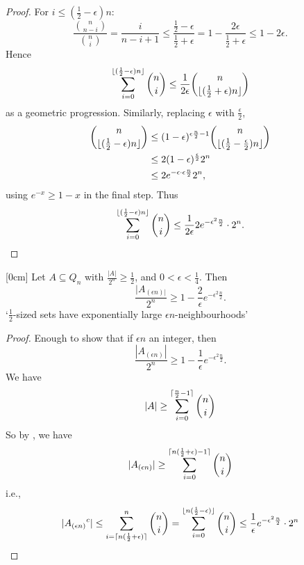 \documentclass{article}
\DeclarePairedDelimiter\ceil{\lceil}{\rceil}
\DeclarePairedDelimiter\floor{\lfloor}{\rfloor}
\let\subset\subseteq
\begin{document}
\begin{proof}
  For $i \leq (\frac{1}{2} - \epsilon) n:$
  \begin{equation*}
    \frac{\binom{n}{n-i}}{\binom{n}{i}} = \frac{i}{n-i+1} \leq \frac{\frac{1}{2} - \epsilon}{\frac{1}{2} + \epsilon} = 1 - \frac{2\epsilon}{\frac{1}{2} + \epsilon} \leq 1 - 2\epsilon.
  \end{equation*}
  Hence
  \begin{equation*}
    \sum_{i=0}^{\floor{(\frac{1}{2}-\epsilon) n}} \binom{n}{i} \leq \frac{1}{2\epsilon} \binom{n}{\floor{(\frac{1}{2} + \epsilon) n}}
  \end{equation*}
  as a geometric progression.
  Similarly, replacing $\epsilon$ with $\frac \epsilon 2$,
  \begin{align*}
    \binom{n}{\floor{(\frac{1}{2} - \epsilon)n}} &\leq (1-\epsilon)^{\epsilon \frac{n}{2} - 1} \binom{n}{\floor{(\frac{1}{2} - \frac{\epsilon}{2}) n}} \\
                                                 &\leq 2(1-\epsilon)^{\frac \epsilon 2} 2^n \\
                                                 &\leq 2 e^{-\epsilon \cdot \epsilon \frac n2} 2^n,
  \end{align*}
  using $e^{-x} \geq 1-x$ in the final step.
  Thus
  \begin{equation*}
    \sum_{i=0}^{\floor{(\frac{1}{2} - \epsilon) n}} \binom{n}{i}\leq \frac{1}{2\epsilon} 2 e^{-\epsilon^2 \frac{n}{2}} \cdot 2^n. \qedhere
  \end{equation*}
\end{proof}

\begin{nthm}\label{thm:2.5}
  [0cm]
  Let $A \subset Q_n$ with $\frac{|A|}{2^n} \geq \frac{1}{2}$, and $0 < \epsilon < \frac{1}{4}$.
  Then
  \begin{equation*}
    \frac{|A_{(\epsilon n)|}}{2^n} \geq 1 - \frac{2}{\epsilon} e^{-\epsilon^2 \frac{n}{2}}.
  \end{equation*}
  `$\frac{1}{2}$-sized sets have exponentially large $\epsilon n$-neighbourhoods'
\end{nthm}
\begin{proof}
  Enough to show that if $\epsilon n$ an integer, then
  \begin{equation*}
    \frac{|A_{(\epsilon n)}|}{2^n} \geq 1 - \frac{1}{\epsilon} e^{-\epsilon^2 \frac{n}{2}}.
  \end{equation*}
  We have
  \begin{equation*}
    |A| \geq \sum_{i=0}^{\ceil{\frac{n}{2} - 1}} \binom{n}{i}
  \end{equation*}
  So by , we have
  \begin{equation*}
    |A_{(\epsilon n)}| \geq \sum_{i=0}^{\ceil{n(\frac{1}{2} + \epsilon) - 1}} \binom{n}{i}
  \end{equation*}
  i.e.,
  \begin{equation*}
    |{A_{(\epsilon n)}}^c| \leq \sum_{i=\ceil{n (\frac{1}{2} + \epsilon)}}^n \binom{n}{i} = \sum_{i=0}^{\floor{n(\frac{1}{2}- \epsilon)}} \binom{n}{i} \leq \frac{1}{\epsilon} e^{-\epsilon^2 \frac{n}{2}} \cdot 2^n
  \end{equation*}
\end{proof}
\end{document}
